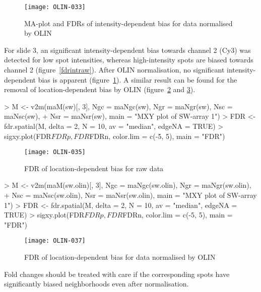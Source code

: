 \documentclass[a4paper,11pt]{article}
\begin{document}
\begin{figure}
\centering
\texttt{[image: OLIN-033]}
\caption{MA-plot and FDRs of  intensity-dependent bias for data normalised by OLIN }
\label{fdrintolin}
\end{figure}

For slide 3, an significant intensity-dependent bias towards channel 2 (Cy3)
was detected for low spot intensities, whereas high-intensity spots are biased
towards channel 2 (figure~\ref{fdrintraw}). After OLIN normalisation, no significant intensity-dependent
bias is apparent (figure~\ref{fdrintolin}). A similar result can be found for the 
removal of location-dependent bias by OLIN (figure~\ref{fdrspatialraw} and \ref{fdrspatialolin}).


\begin{Schunk}
\begin{Sinput}
> M <- v2m(maM(sw)[, 3], Ngc = maNgc(sw), Ngr = maNgr(sw), Nsc = maNsc(sw), 
+     Nsr = maNsr(sw), main = "MXY plot of SW-array 1")
> FDR <- fdr.spatial(M, delta = 2, N = 10, av = "median", edgeNA = TRUE)
> sigxy.plot(FDR$FDRp, FDR$FDRn, color.lim = c(-5, 5), main = "FDR")
\end{Sinput}
\end{Schunk}




\begin{figure}
\centering
\texttt{[image: OLIN-035]}
\caption{FDR of location-dependent bias for raw data }
\label{fdrspatialraw}
\end{figure}


\begin{Schunk}
\begin{Sinput}
> M <- v2m(maM(sw.olin)[, 3], Ngc = maNgc(sw.olin), Ngr = maNgr(sw.olin), 
+     Nsc = maNsc(sw.olin), Nsr = maNsr(sw.olin), main = "MXY plot of SW-array 1")
> FDR <- fdr.spatial(M, delta = 2, N = 10, av = "median", edgeNA = TRUE)
> sigxy.plot(FDR$FDRp, FDR$FDRn, color.lim = c(-5, 5), main = "FDR")
\end{Sinput}
\end{Schunk}


\begin{figure}
\centering
\texttt{[image: OLIN-037]}
\caption{FDR of location-dependent bias for data normalised by OLIN}
\label{fdrspatialolin}
\end{figure}


 
Fold changes should be treated with care if the corresponding spots have significantly biased 
neighborhoods even after normalisation. 
\end{document}
